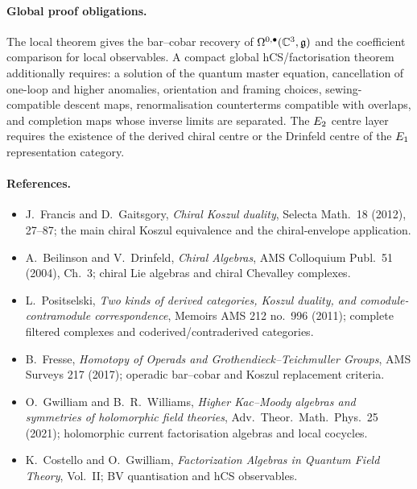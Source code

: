 \paragraph{Global proof obligations.}
The local theorem gives the bar--cobar recovery of
$\Omega^{0,\bullet}(\mathbb{C}^3,\mathfrak{g})$ and the coefficient comparison for local
observables.  A compact global hCS/factorisation theorem additionally
requires: a solution of the quantum master equation, cancellation of
one-loop and higher anomalies, orientation and framing choices,
sewing-compatible descent maps, renormalisation counterterms compatible
with overlaps, and completion maps whose inverse limits are separated.
The $E_2$ centre layer requires the existence of the derived chiral
centre or the Drinfeld centre of the $E_1$ representation category.

\paragraph{References.}
\begin{itemize}
  \item J.\ Francis and D.\ Gaitsgory, \emph{Chiral Koszul duality},
    Selecta Math.\ 18 (2012), 27--87; the main chiral Koszul
    equivalence and the chiral-envelope application.
  \item A.\ Beilinson and V.\ Drinfeld, \emph{Chiral Algebras}, AMS
    Colloquium Publ.\ 51 (2004), Ch.~3; chiral Lie algebras and
    chiral Chevalley complexes.
  \item L.\ Positselski, \emph{Two kinds of derived categories, Koszul
    duality, and comodule-contramodule correspondence}, Memoirs AMS
    212 no.~996 (2011); complete filtered complexes and
    coderived/contraderived categories.
  \item B.\ Fresse, \emph{Homotopy of Operads and
    Grothendieck--Teichmuller Groups}, AMS Surveys 217 (2017);
    operadic bar--cobar and Koszul replacement criteria.
  \item O.\ Gwilliam and B.\ R.\ Williams, \emph{Higher Kac--Moody
    algebras and symmetries of holomorphic field theories},
    Adv.\ Theor.\ Math.\ Phys.\ 25 (2021); holomorphic current
    factorisation algebras and local cocycles.
  \item K.\ Costello and O.\ Gwilliam, \emph{Factorization Algebras in
    Quantum Field Theory}, Vol.~II; BV quantisation and hCS
    observables.
\end{itemize}
